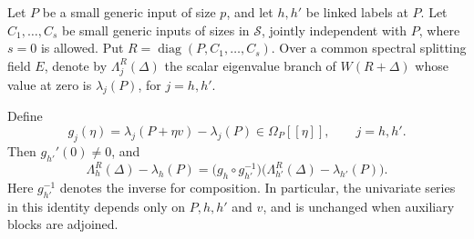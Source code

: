 \begin{proposition}
\label{prop:functional-linkage}
Let $P$ be a small generic input of size $p$, and let $h,h'$ be linked
labels at $P$.  Let $C_1,\ldots,C_s$ be small generic inputs of sizes in
$\mathcal S$, jointly independent with $P$, where $s=0$ is allowed.
Put $R=\operatorname{diag}(P,C_1,\ldots,C_s)$.
Over a common spectral splitting field $E$, denote by
$\Lambda_j^R(\Delta)$ the scalar eigenvalue branch of $W(R+\Delta)$
whose value at zero is $\lambda_j(P)$, for $j=h,h'$.

Define
\[
 g_j(\eta)=\lambda_j(P+\eta v)-\lambda_j(P)
 \in\Omega_P[[\eta]],\qquad j=h,h'.
\]
Then $g_{h'}'(0)\neq 0$, and
\begin{equation}
 \Lambda_h^R(\Delta)-\lambda_h(P)
 =\bigl(g_h\circ g_{h'}^{-1}\bigr)
       \bigl(\Lambda_{h'}^R(\Delta)-\lambda_{h'}(P)\bigr).
 \label{eq:functional-linkage}
\end{equation}
Here $g_{h'}^{-1}$ denotes the inverse for composition.  In particular,
the univariate series in this identity depends only on $P,h,h'$ and $v$,
and is unchanged when auxiliary blocks are adjoined.
\end{proposition}

